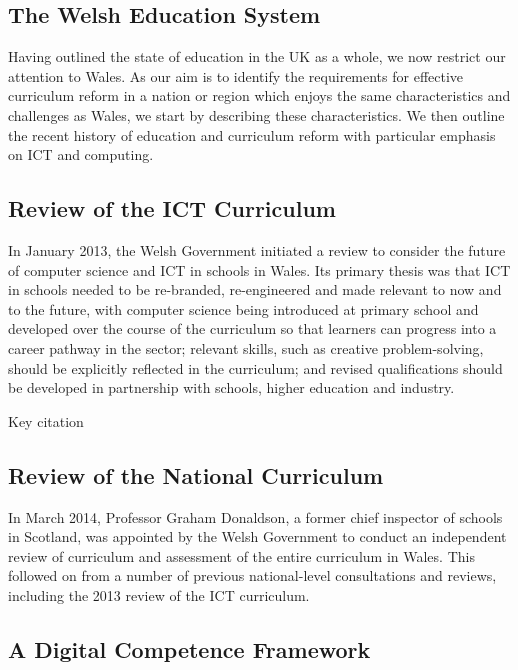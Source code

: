 \documentclass[sigconf]{acmart}
\begin{document}
\subsection{The Welsh Education System}

Having outlined the state of education in the UK as a whole, we now
restrict our attention to Wales. As our aim is to identify the
requirements for effective curriculum reform in a nation or region
which enjoys the same characteristics and challenges as Wales, we
start by describing these characteristics. We then outline the recent
history of education and curriculum reform with particular emphasis on
ICT and computing.

\subsection{Review of the ICT Curriculum}

In January 2013, the Welsh Government initiated a review to consider
the future of computer science and ICT in schools in Wales. Its
primary thesis was that ICT in schools needed to be re-branded,
re-engineered and made relevant to now and to the future, with
computer science being introduced at primary school and developed over
the course of the curriculum so that learners can progress into a
career pathway in the sector; relevant skills, such as creative
problem-solving, should be explicitly reflected in the curriculum; and
revised qualifications should be developed in partnership with
schools, higher education and industry.

Key citation~\cite{wgictreview:2013}

\subsection{Review of the National Curriculum}

In March 2014, Professor Graham Donaldson, a former chief inspector of
schools in Scotland, was appointed by the Welsh Government to conduct
an independent review of curriculum and assessment of the entire
curriculum in Wales. This followed on from a number of previous
national-level consultations and reviews, including the 2013 review of
the ICT curriculum.

\subsection{A Digital Competence Framework}
\end{document}
